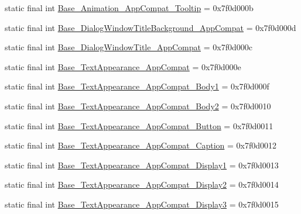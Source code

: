 \begin{DoxyCompactItemize}
\item 
static final int \mbox{\hyperlink{classcom_1_1synnapps_1_1carouselview_1_1_r_1_1style_afabd3033ac86f39f2abfb7ce52d44fb5}{Base\+\_\+\+Animation\+\_\+\+App\+Compat\+\_\+\+Tooltip}} = 0x7f0d000b
\item 
static final int \mbox{\hyperlink{classcom_1_1synnapps_1_1carouselview_1_1_r_1_1style_a486c4fece2332b51e0033dbeebe17f04}{Base\+\_\+\+Dialog\+Window\+Title\+Background\+\_\+\+App\+Compat}} = 0x7f0d000d
\item 
static final int \mbox{\hyperlink{classcom_1_1synnapps_1_1carouselview_1_1_r_1_1style_a1e7761c0e4cd59ad6fd9229fb825e98e}{Base\+\_\+\+Dialog\+Window\+Title\+\_\+\+App\+Compat}} = 0x7f0d000c
\item 
static final int \mbox{\hyperlink{classcom_1_1synnapps_1_1carouselview_1_1_r_1_1style_a2ae12111acc9750b9aa857b09ef800df}{Base\+\_\+\+Text\+Appearance\+\_\+\+App\+Compat}} = 0x7f0d000e
\item 
static final int \mbox{\hyperlink{classcom_1_1synnapps_1_1carouselview_1_1_r_1_1style_aa51ac1458ed0938dba1cffcfaead55cf}{Base\+\_\+\+Text\+Appearance\+\_\+\+App\+Compat\+\_\+\+Body1}} = 0x7f0d000f
\item 
static final int \mbox{\hyperlink{classcom_1_1synnapps_1_1carouselview_1_1_r_1_1style_acf0a860c5e700ce13be659ba13ff1e1f}{Base\+\_\+\+Text\+Appearance\+\_\+\+App\+Compat\+\_\+\+Body2}} = 0x7f0d0010
\item 
static final int \mbox{\hyperlink{classcom_1_1synnapps_1_1carouselview_1_1_r_1_1style_ac11548f3be1955fc12c00fe753810fad}{Base\+\_\+\+Text\+Appearance\+\_\+\+App\+Compat\+\_\+\+Button}} = 0x7f0d0011
\item 
static final int \mbox{\hyperlink{classcom_1_1synnapps_1_1carouselview_1_1_r_1_1style_a690882856d8fa7580bdfd96a6249cc7d}{Base\+\_\+\+Text\+Appearance\+\_\+\+App\+Compat\+\_\+\+Caption}} = 0x7f0d0012
\item 
static final int \mbox{\hyperlink{classcom_1_1synnapps_1_1carouselview_1_1_r_1_1style_a0d3fa191c82fe107ddf78af8a4528558}{Base\+\_\+\+Text\+Appearance\+\_\+\+App\+Compat\+\_\+\+Display1}} = 0x7f0d0013
\item 
static final int \mbox{\hyperlink{classcom_1_1synnapps_1_1carouselview_1_1_r_1_1style_acd4c54d3b8606ddf1dbb1d7a665501b4}{Base\+\_\+\+Text\+Appearance\+\_\+\+App\+Compat\+\_\+\+Display2}} = 0x7f0d0014
\item 
static final int \mbox{\hyperlink{classcom_1_1synnapps_1_1carouselview_1_1_r_1_1style_aa797f1336f66f9d8fbbb333414909ea8}{Base\+\_\+\+Text\+Appearance\+\_\+\+App\+Compat\+\_\+\+Display3}} = 0x7f0d0015

\end{DoxyCompactItemize}
